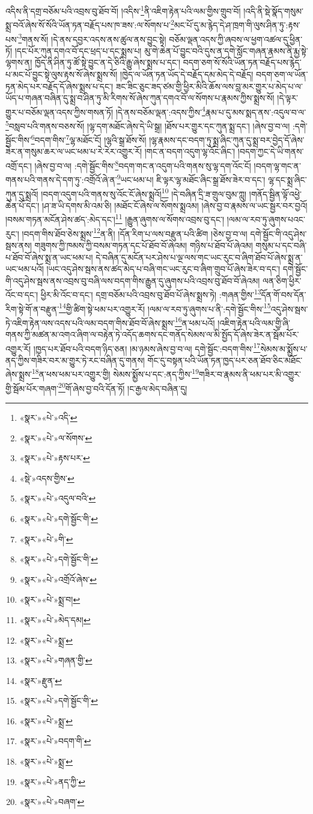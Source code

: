 འདིས་ནི་དགྲ་བཅོམ་པའི་འབྲས་བུ་ཐོབ་བོ། །འདིས་\footnote{«སྣར་»«པེ་»འདི་}ནི་འཇིག་རྟེན་པའི་ལམ་གྱིས་གྲུབ་བོ། །འདི་ནི་སྡེ་སྣོད་གསུམ་སྨྲ་བའོ་ཞེས་སོ་སོའི་ཡོན་ཏན་བརྗོད་པས་ཁ་ཟས་:ལ་སོགས་པ་\footnote{«སྣར་»«པེ་»ལ་སོགས་}མང་པོ་དུ་མ་རྙེད་དེ་ཤ་ཁྲག་གི་ལུས་ཤིན་ཏུ་:རྟས་པས་\footnote{«སྣར་»«པེ་»རྟས་པར་}གནས་སོ། །དེ་ནས་དབྱར་འདས་ནས་ཚུལ་ནས་བྱུང་སྟེ། བཅོམ་ལྡན་འདས་ཀྱི་ཞབས་ལ་ཕྱག་འཚལ་དུ་ཕྱིན་ཏོ། །དང་པོར་ཀུན་དགའ་བོ་དང་ཕྲད་པ་དང་སྨྲས་པ། མུ་གེ་ཆེན་པོ་བྱུང་བའི་དུས་ན་དགེ་སློང་གཞན་རྣམས་ནི་རྨྱ་སྟེ་ལྷགས་ན། ཁྱོད་ནི་ཤིན་ཏུ་ཚོ་སྟེ་བྱུང་ན་དེ་ཅིའི་རྒྱུ་ཞེས་སྨྲས་པ་དང་། བདག་ཅག་སོ་སོའི་ཡོན་ཏན་བརྗོད་པས་རྙེད་པ་མང་པོ་བྱུང་སྟེ་ལུས་རྟས་སོ་ཞེས་སྨྲས་སོ། །ཁྱེད་ལ་ཡོན་ཏན་ཡོད་དེ་བརྗོད་དམ་མེད་དེ་བརྗོད། བདག་ཅག་ལ་ཡོན་ཏན་མེད་པར་བརྗོད་དོ་ཞེས་སྨྲས་པ་དང་། ཟང་ཟིང་ཅུང་ཟད་ཙམ་གྱི་ཕྱིར་མིའི་ཆོས་ལས་བླ་མར་གྱུར་པ་མེད་པ་ལ་ཡོད་པ་གཞན་བཞིན་དུ་སྨྲ་བ་ཤིན་ཏུ་མི་རིགས་སོ་ཞེས་ཀུན་དགའ་བོ་ལ་སོགས་པ་རྣམས་ཀྱིས་སྨྲས་སོ། །དེ་ལྟར་གྱུར་པ་བཅོམ་ལྡན་འདས་ཀྱིས་གསན་ཏོ། །དེ་ནས་བཅོམ་ལྡན་:འདས་ཀྱིས་\footnote{«སྡེ་»འདས་གྱིས་}རྣམ་པ་དུ་མས་སྨད་ནས་:འདུལ་བ་ལ་\footnote{«སྣར་»«པེ་»འདུལ་བའི་}བསླབ་པའི་གནས་བཅས་སོ། །ལྷ་དག་མཐོང་ཞེས་དེ་ཡི་སྒྲ། །ཐོས་པར་གྱུར་དང་ཀུན་སྨྲ་དང་། །ཞེས་བྱ་བ་ལ། :དགེ་སྦྱོང་གིས་\footnote{«སྣར་»«པེ་»དགེ་སྦྱོང་གི་}བདག་གིས་\footnote{«སྣར་»«པེ་»གི་}ལྷ་མཐོང་ངོ། །ལྷའི་སྒྲ་ཐོས་སོ། །ལྷ་རྣམས་དང་བདག་ཏུ་སྨྲ་ཞིང་ཀུན་དུ་སྨྲ་བར་བྱེད་དོ་ཞེས་ཟེར་ན་གསུམ་ཆར་ལ་ཡང་ཕམ་པ་རེ་རེར་འགྱུར་རོ། །གང་ན་བདག་འདུག་ལྷ་འོང་ཞིང་། །བདག་ཀྱང་དེ་ཡི་གནས་འགྲོ་དང་། །ཞེས་བྱ་བ་ལ། :དགེ་སྦྱོང་གིས་\footnote{«སྣར་»«པེ་»དགེ་སྦྱོང་གི་}བདག་གང་ན་འདུག་པའི་གནས་སུ་ལྷ་དག་འོང་ངོ། །བདག་ལྷ་གང་ན་གནས་པའི་གནས་དེ་དག་ཏུ་:འགྲོའོ་ཞེ་ན་\footnote{«སྣར་»«པེ་»འགྲོའོ་ཞེས་}ཡང་ཕམ་པ། ཇི་ལྟར་ལྷ་མཐོང་ཞིང་སྒྲ་ཐོས་ཟེར་བ་དང་། ལྷ་དང་སྨྲ་ཞིང་ཀུན་དུ་སྨྲའོ། །བདག་འདུག་པའི་གནས་སུ་འོང་ངོ་ཞེས་སྨྲའོ།\footnote{«སྣར་»«པེ་»སྨྲ་བ།} །དེ་བཞིན་དྲི་ཟ་གྲུལ་བུམ་ཀླུ། །གནོད་སྦྱིན་ལྟོ་འཕྱེ་ཆེན་པོ་དང་། །ཤ་ཟ་ཡི་དགས་མི་འམ་ཅི། །མཐོང་ངོ་ཞེས་ལ་སོགས་སྨྲའམ། །ཞེས་བྱ་བ་རྣམས་ལ་ཡང་སྦྱར་བར་བྱའོ། །བསམ་གཏན་མངོན་ཤེས་ཚད་:མེད་དང་།\footnote{«སྣར་»«པེ་»མེད་དམ།} །རྒྱུན་ཞུགས་ལ་སོགས་འབྲས་བུ་དང་། །ལམ་ལ་རབ་ཏུ་ཞུགས་པའང་རུང་། །བདག་གིས་ཐོབ་ཅེས་སྨྲས་\footnote{«སྣར་»«པེ་»སྨྲ་}ན་ནི། །དོན་རིག་པ་ལས་བརྫུན་པའི་ཚིག །ཅེས་བྱ་བ་ལ། དགེ་སྦྱོང་གི་འདུ་ཤེས་སྦས་ནས། གཟུགས་ཀྱི་ཁམས་ཀྱི་བསམ་གཏན་དང་པོ་ཐོབ་བོ་ཞེའམ། གཉིས་པ་ཐོབ་པོ་ཞེའམ། གསུམ་པ་དང་བཞི་པ་ཐོབ་བོ་ཞེས་སྨྲ་ན་ཡང་ཕམ་པ། དེ་བཞིན་དུ་མངོན་པར་ཤེས་པ་ལྔ་ལས་གང་ཡང་རུང་བ་ཞིག་ཐོབ་པོ་ཞེས་སྨྲ་ན་ཡང་ཕམ་པའོ། །ཡང་འདུ་ཤེས་སྦས་ནས་ཚད་མེད་པ་བཞི་གང་ཡང་རུང་བ་ཞིག་གྲུབ་པོ་ཞེས་ཟེར་བ་དང་། དགེ་སྦྱོང་གི་འདུ་ཤེས་སྦས་ནས་འབྲས་བུ་བཞི་ལས་བདག་གིས་རྒྱུན་དུ་ཞུགས་པའི་འབྲས་བུ་ཐོབ་བོ་ཞེའམ། ལན་ཅིག་ཕྱིར་འོང་བ་དང་། ཕྱིར་མི་འོང་བ་དང་། དགྲ་བཅོམ་པའི་འབྲས་བུ་ཐོབ་པོ་ཞེས་སྨྲས་ཏེ། :གཞན་གྱིས་\footnote{«སྣར་»«པེ་»གཞན་གྱི་}དོན་གོ་བས་དོན་རིག་སྟེ་གོ་ན་བརྫུན་\footnote{«སྣར་»རྫུན་}གྱི་ཚིག་སྟེ་ཕམ་པར་འགྱུར་རོ། །ལམ་ལ་རབ་ཏུ་ཞུགས་པ་ནི་:དགེ་སྦྱོང་གིས་\footnote{«སྣར་»«པེ་»དགེ་སྦྱོང་གི་}འདུ་ཤེས་སྦས་ཏེ་འཇིག་རྟེན་ལས་འདས་པའི་ལམ་བདག་གིས་ཐོབ་བོ་ཞེས་སྨྲས་\footnote{«སྣར་»«པེ་»སྨྲ་}ན་ཕམ་པའོ། །འཇིག་རྟེན་པའི་ལམ་གྱི་ཞི་གནས་ཀྱི་མཚན་མ་འགའ་ཞིག་ལ་བརྟེན་ཏེ་འདོད་ཆགས་དང་གནོད་སེམས་ལ་མི་སྤྱོད་དོ་ཞེས་ཟེར་ན་སྦོམ་པོར་འགྱུར་རོ། །ཁྱད་པར་ཐོབ་པའི་བདག་ཉིད་ཅན། །མ་ཉམས་ཞེས་བྱ་བ་ལ། དགེ་སྦྱོང་:བདག་གིས་\footnote{«སྣར་»«པེ་»བདག་གི་}སེམས་མ་སྨྱོས་པ་ནད་ཀྱིས་གཟིར་བར་མ་གྱུར་ཏེ་རང་བཞིན་དུ་གནས། གོང་དུ་བསྟན་པའི་ཡོན་ཏན་ཁྱད་པར་ཅན་ཐོབ་ཅིང་མཐོང་ཞེས་སྨྲས་\footnote{«སྣར་»«པེ་»སྨྲ་}ན་ཕས་ཕམ་པར་འགྱུར་གྱི། སེམས་སྨྱོས་པ་དང་:ནད་ཀྱིས་\footnote{«སྣར་»«པེ་»ནད་ཀྱི་}གཟིར་བ་རྣམས་ནི་ཕམ་པར་མི་འགྱུར་གྱི་སྦོམ་པོར་གཞག་\footnote{«སྣར་»«པེ་»བཞག་}གོ་ཞེས་བྱ་བའི་དོན་ཏོ། །ང་རྒྱལ་མེད་བཞིན་དུ། 